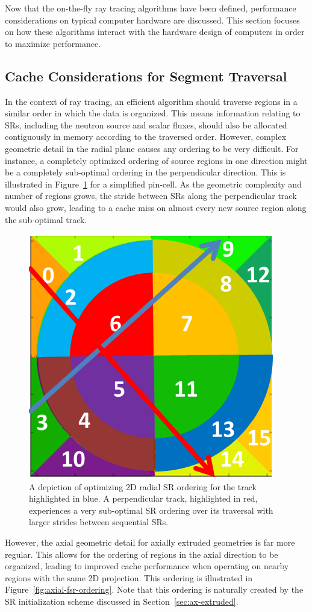 Now that the on-the-fly ray tracing algorithms have been defined, performance considerations on typical computer hardware are discussed. This section focuses on how these algorithms interact with the hardware design of computers in order to maximize performance.

\subsection{Cache Considerations for Segment Traversal}

In the context of ray tracing, an efficient algorithm should traverse regions in a similar order in which the data is organized. This means information relating to \ac{SR}s, including the neutron source and scalar fluxes, should also be allocated contiguously in memory according to the traversed order. However, complex geometric detail in the radial plane causes any ordering to be very difficult. For instance, a completely optimized ordering of source regions in one direction might be a completely sub-optimal ordering in the perpendicular direction. This is illustrated in Figure~\ref{fig:radial-fsr-ordering} for a simplified pin-cell. As the geometric complexity and number of regions grows, the stride between \ac{SR}s along the perpendicular track would also grow, leading to a cache miss on almost every new source region along the sub-optimal track. 

\begin{figure}[ht!]
	\centering
	\includegraphics[width=0.4\linewidth]{figures/FSR_ordering_radial.PNG}
	\caption{A depiction of optimizing 2D radial \ac{SR} ordering for the track highlighted in blue. A perpendicular track, highlighted in red, experiences a very sub-optimal \ac{SR} ordering over its traversal with larger strides between sequential \ac{SR}s.}
	\label{fig:radial-fsr-ordering}
\end{figure}

However, the axial geometric detail for axially extruded geometries is far more regular. This allows for the ordering of regions in the axial direction to be organized, leading to improved cache performance when operating on nearby regions with the same 2D projection. This ordering is illustrated in Figure~\ref{fig:axial-fsr-ordering}. Note that this ordering is naturally created by the \ac{SR} initialization scheme discussed in Section~\ref{sec:ax-extruded}.

